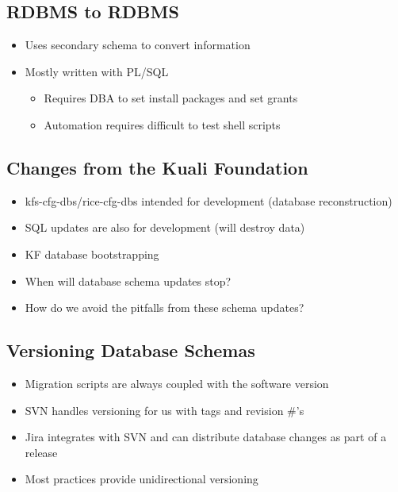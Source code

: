 \documentclass[12pt,notitlepage]{article}
\begin{document}
\begin{s5presentation}
  \W \begin{s5slide}
    \W \section{RDBMS to RDBMS}
    \begin{itemize}
      \item Uses secondary schema to convert information
      \item Mostly written with PL/SQL
      \begin{itemize}
        \item Requires DBA to set install packages and set grants
        \item Automation requires difficult to test shell scripts
      \end{itemize}
    \end{itemize}
  \W \end {s5slide}

  \W \begin{s5slide}
    \section{Changes from the Kuali Foundation}
    \begin{itemize}
      \item kfs-cfg-dbs/rice-cfg-dbs intended for development (database reconstruction)
      \item SQL updates are also for development (will destroy data)
      \item KF database bootstrapping
      \item When will database schema updates stop?
      \item How do we avoid the pitfalls from these schema updates?
      \end{itemize}
    \W \end{s5slide}

  \W \begin{s5slide}
    \W \section{Versioning Database Schemas}
    \begin{itemize}
      \item Migration scripts are always coupled with the software version
      \item SVN handles versioning for us with tags and revision #'s
      \item Jira integrates with SVN and can distribute database changes as part
        of a release
      \item Most practices provide unidirectional versioning
    \end{itemize}
  \W \end {s5slide}


\end{s5presentation}
\end{document}
